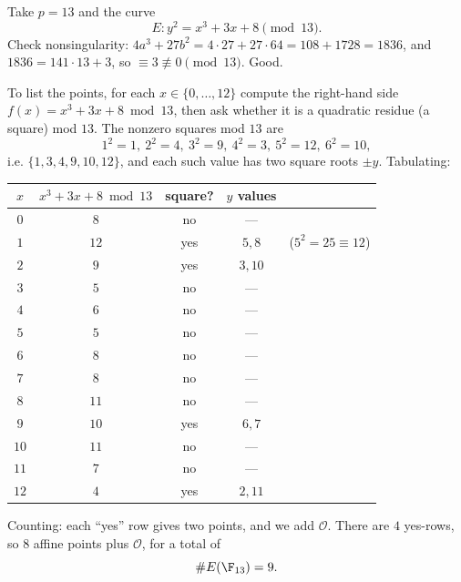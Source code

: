 \begin{example}
\label{ch21:tinycurve}
Take $p = 13$ and the curve
\[
E : y^2 = x^3 + 3x + 8 \pmod{13}.
\]
Check nonsingularity: $4a^3 + 27b^2 = 4\cdot 27 + 27\cdot 64 = 108 + 1728 = 1836$, and
$1836 = 141\cdot 13 + 3$, so $\equiv 3 \not\equiv 0 \pmod{13}$. Good.

To list the points, for each $x \in \{0,\dots,12\}$ compute the right-hand side
$f(x)=x^3+3x+8 \bmod 13$, then ask whether it is a quadratic residue (a square) mod
$13$. The nonzero squares mod $13$ are
\[
1^2{=}1,\ 2^2{=}4,\ 3^2{=}9,\ 4^2{=}3,\ 5^2{=}12,\ 6^2{=}10,
\]
i.e. $\{1,3,4,9,10,12\}$, and each such value has two square roots $\pm y$. Tabulating:

\begin{center}
\begin{tabular}{ccccl}
\toprule
$x$ & $x^3+3x+8 \bmod 13$ & square? & $y$ values & \\
\midrule
$0$ & $8$  & no  & --- \\
$1$ & $12$ & yes & $5,8$ & ($5^2=25\equiv12$)\\
$2$ & $9$  & yes & $3,10$ \\
$3$ & $5$  & no  & --- \\
$4$ & $6$  & no  & --- \\
$5$ & $5$  & no  & --- \\
$6$ & $8$  & no  & --- \\
$7$ & $8$  & no  & --- \\
$8$ & $11$ & no  & --- \\
$9$ & $10$ & yes & $6,7$ \\
$10$& $11$ & no  & --- \\
$11$& $7$  & no  & --- \\
$12$& $4$  & yes & $2,11$ \\
\bottomrule
\end{tabular}
\end{center}

Counting: each ``yes'' row gives two points, and we add $\mathcal{O}$. There are $4$
yes-rows, so $8$ affine points plus $\mathcal{O}$, for a total of
\[
\#E(\F_{13}) = 9.
\]
\end{example}

